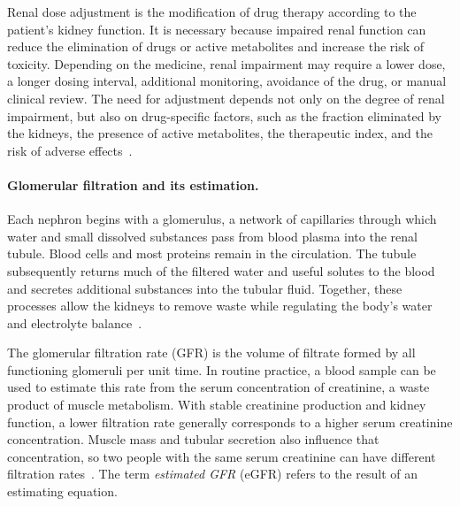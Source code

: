 \documentclass[12pt,a4paper,twoside]{book}
\begin{document}
Renal dose adjustment is the modification of drug therapy according to the patient's kidney function. 
It is necessary because impaired renal function can reduce the elimination of drugs or active metabolites and increase the risk of toxicity. 
Depending on the medicine, renal impairment may require a lower dose, a longer dosing interval, additional monitoring, avoidance of the drug, or manual clinical review. 
The need for adjustment depends not only on the degree of renal impairment, but also on drug-specific factors, such as the fraction eliminated by the kidneys, the presence of active metabolites, the therapeutic index, and the risk of adverse effects~\cite{artDooguePolasek2011DrugDosingRenalDisease,artStefani2019AdjustDrugDosesCKD}.

\paragraph{Glomerular filtration and its estimation.}
Each nephron begins with a glomerulus, a network of capillaries through which water and small dissolved substances pass from blood plasma into the renal tubule.
Blood cells and most proteins remain in the circulation.
The tubule subsequently returns much of the filtered water and useful solutes to the blood and secretes additional substances into the tubular fluid.
Together, these processes allow the kidneys to remove waste while regulating the body's water and electrolyte balance~\cite{miscNIDDKKidneys}.

The glomerular filtration rate (GFR) is the volume of filtrate formed by all functioning glomeruli per unit time.
In routine practice, a blood sample can be used to estimate this rate from the serum concentration of creatinine, a waste product of muscle metabolism.
With stable creatinine production and kidney function, a lower filtration rate generally corresponds to a higher serum creatinine concentration.
Muscle mass and tubular secretion also influence that concentration, so two people with the same serum creatinine can have different filtration rates~\cite{miscNIDDKDrugDosing,miscNKFGFRFAQ}.
The term \emph{estimated GFR} (eGFR) refers to the result of an estimating equation.
\end{document}
